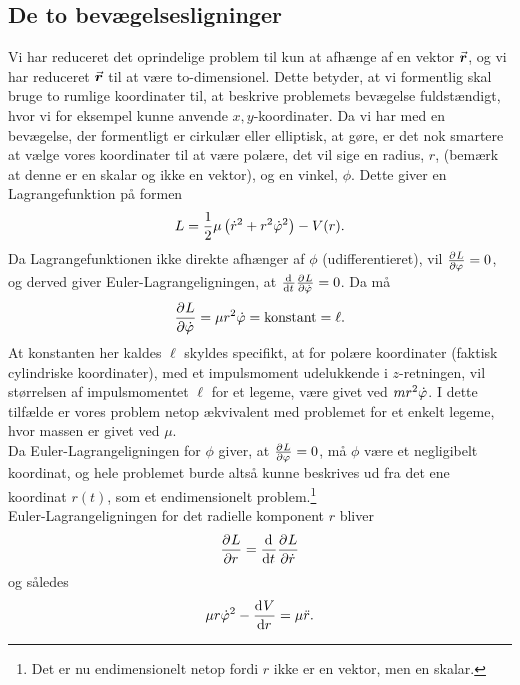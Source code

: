 \subsection{De to bevægelsesligninger}
Vi har reduceret det oprindelige problem til kun at afhænge af en vektor $\v{r}$, og vi har reduceret $\v{r}$ til at være to-dimensionel. Dette betyder, at vi formentlig skal bruge to rumlige koordinater til, at beskrive problemets bevægelse fuldstændigt, hvor vi for eksempel kunne anvende $x,y$-koordinater. Da vi har med en bevægelse, der formentligt er cirkulær eller elliptisk, at gøre, er det nok smartere at vælge vores koordinater til at være polære, det vil sige en radius, $r$, (bemærk at denne er en skalar og ikke en vektor), og en vinkel, $\phi$. Dette giver en Lagrangefunktion på formen
\begin{align}
	L = \frac{1}{2}\mu\left(\dt{r}^2 + r^2 \dt{\phi}^2\right) - V(r).
\end{align}
Da Lagrangefunktionen ikke direkte afhænger af $\phi$ (udifferentieret), vil $\pdif{\phi}{L} = 0$, og derved giver Euler-Lagrangeligningen, at $\dif{t}{} \pdif{\dt{\phi}}{L} = 0$. Da må
\begin{align}
	\pdif{\dt{\phi}}{L} = \mu r^2 \dt{\phi} = \text{konstant} = \ell .
\end{align}
At konstanten her kaldes $\ell $ skyldes specifikt, at for polære koordinater (faktisk cylindriske koordinater), med et impulsmoment udelukkende i $z$-retningen, vil størrelsen af impulsmomentet $\ell $ for et legeme, være givet ved $m r^2 \dt{\phi}$. I dette tilfælde er vores problem netop ækvivalent med problemet for et enkelt legeme, hvor massen er givet ved $\mu$. \\
%
Da Euler-Lagrangeligningen for $\phi$ giver, at $\pdif{\phi}{L} = 0$, må $\phi$ være et negligibelt koordinat, og hele problemet burde altså kunne beskrives ud fra det ene koordinat $r(t)$, som et endimensionelt problem.\footnote{Det er nu endimensionelt netop fordi $r$ ikke er en vektor, men en skalar.} \\
%
Euler-Lagrangeligningen for det radielle komponent $r$ bliver
\begin{align}
	\pdif{r}{L} = \dif{t}{} \pdif{\dt{r}}{L}
\end{align}
og således
\begin{align}
	\mu r \dt{\phi}^2 - \dif{r}{V} = \mu \ddt{r}.
\end{align}

